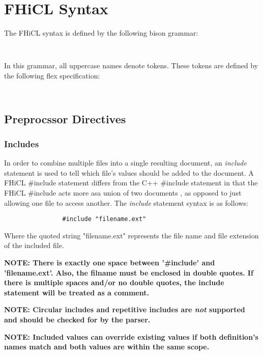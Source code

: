 \documentclass{memarticle}
\begin{document}
\section{FHiCL Syntax}

	The FHiCL syntax is defined by the following bison grammar:
	\begin{verbatim}
		
	\end{verbatim}

	In this grammar,
	all uppercase names denote tokens.
	These tokens are defined by the following flex specification:
	\begin{verbatim}
	
	\end{verbatim}
	\subsection{Preprocssor Directives}
		\subsubsection{Includes}
			In order to combine multiple files into a single resulting document,
			an \emph{include} statement is used to tell which file's values should be added to the document.
			A FHiCL \#include statement differs from the C++ \#include statement 
			in that the FHiCL \#include acts 
			more asa union of two documents
			, as opposed to just allowing one file to access another.
			The \emph{include} statement syntax is as follows:
			\begin{verbatim}
				#include "filename.ext"
			\end{verbatim}
			\vspace{1mm}
			\par
			Where the quoted string "filename.ext" represents the file name and file extension of the included file.
			\vspace{1mm}
			\par
			\bf NOTE: \rm There is exactly one space between '\#include' and 'filename.ext'.
			Also, the filname must be enclosed in double quotes.
			If there is multiple spaces and/or no double quotes, 
			the include statement will be treated as a comment.
			\par
			\bf NOTE: \rm Circular includes 
			and repetitive includes 
			are \emph{not} supported and should be checked for by the parser.
			\par
			\bf NOTE: \rm Included values can override existing values 
			if both definition's names match 
			and both values are within the same scope.	
\end{document}
